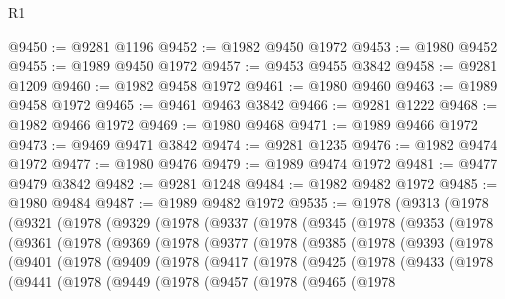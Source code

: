 \begin{lexlean}{R1}
\begin{coremodule}
@9450 := @9281 @1196
@9452 := @1982 @9450 @1972
@9453 := @1980 @9452
@9455 := @1989 @9450 @1972
@9457 := @9453 @9455 @3842
@9458 := @9281 @1209
@9460 := @1982 @9458 @1972
@9461 := @1980 @9460
@9463 := @1989 @9458 @1972
@9465 := @9461 @9463 @3842
@9466 := @9281 @1222
@9468 := @1982 @9466 @1972
@9469 := @1980 @9468
@9471 := @1989 @9466 @1972
@9473 := @9469 @9471 @3842
@9474 := @9281 @1235
@9476 := @1982 @9474 @1972
@9477 := @1980 @9476
@9479 := @1989 @9474 @1972
@9481 := @9477 @9479 @3842
@9482 := @9281 @1248
@9484 := @1982 @9482 @1972
@9485 := @1980 @9484
@9487 := @1989 @9482 @1972
@9535 := @1978
    (@9313
      (@1978
        (@9321
          (@1978
            (@9329
              (@1978
                (@9337
                  (@1978
                    (@9345
                      (@1978
                        (@9353
                          (@1978
                            (@9361
                              (@1978
                                (@9369
                                  (@1978
                                    (@9377
                                      (@1978
                                        (@9385
                                          (@1978
                                            (@9393
                                              (@1978
                                                (@9401
                                                  (@1978
                                                    (@9409
                                                      (@1978
                                                        (@9417
                                                          (@1978
                                                            (@9425
                                                              (@1978
                                                                (@9433
                                                                  (@1978
                                                                    (@9441
                                                                      (@1978
                                                                        (@9449
                                                                          (@1978
                                                                            (@9457
                                                                              (@1978
                                                                                (@9465
                                                                                  (@1978

\end{coremodule}
\end{lexlean}
